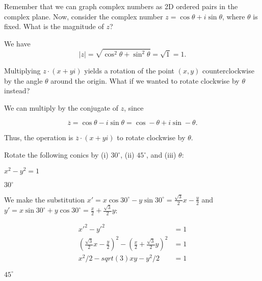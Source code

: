 \documentclass[../gatm_answers.tex]{subfiles}
\begin{document}
\begin{inner_problem}[start=1]
\item Remember that we can graph complex numbers as 2D ordered pairs in the complex plane. Now, consider the complex number $z=\cos \theta + i\sin\theta$, where $\theta$ is fixed. What is the magnitude of $z$?
\end{inner_problem}

We have $$|z|=\sqrt{\cos^2\theta + \sin^2\theta}=\sqrt{1}=1.$$

\begin{inner_problem}
\item Multiplying $z\cdot(x+yi)$ yields a rotation of the point $(x,y)$ counterclockwise by the angle $\theta$ around the origin. What if we wanted to rotate clockwise by $\theta$ instead?
\end{inner_problem}

We can multiply by the conjugate of $z$, since

$$\overline{z}=\cos\theta - i\sin\theta = \cos-\theta + i\sin-\theta.$$

Thus, the operation is $\overline{z}\cdot (x+yi)$ to rotate clockwise by $\theta$.

\begin{outer_problem}
\item Rotate the following conics by (i) $30^\circ$, (ii) $45^\circ$, and (iii) $\theta$:
\end{outer_problem}

\begin{inner_problem}[start=1]
\item $x^2-y^2=1$
\end{inner_problem}

\begin{iinner_problem}[start=1]
\item $30^\circ$
\end{iinner_problem}

We make the substitution $x'=x \cos 30^\circ - y\sin 30^\circ=\frac{\sqrt{3}}{2}x-\frac{y}{2}$ and $y'=x\sin 30^\circ + y\cos 30^\circ=\frac{x}{2}+\frac{\sqrt{3}}{2}y$:

\begin{align*}
x'^2-y'^2&=1 \\
\left(\frac{\sqrt{3}}{2}x-\frac{y}{2}\right)^2 - \left(\frac{x}{2}+\frac{\sqrt{3}}{2}y\right)^2 &= 1 \\
x^2/2 - sqrt(3) x y - y^2/2 &= 1
\end{align*}

\begin{iinner_problem}
\item $45^\circ$
\end{iinner_problem}
\end{document}
